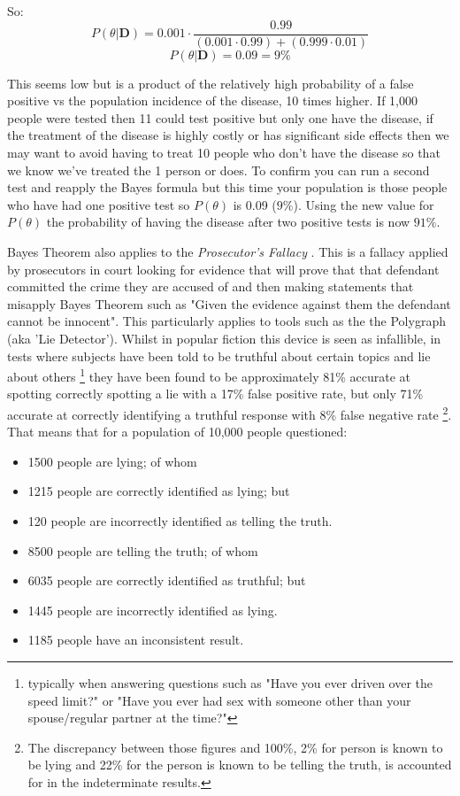 So:
\begin{equation}
    P(\theta | \textbf{D}) = 0.001 \cdot \frac{0.99}{(0.001 \cdot 0.99) + (0.999 \cdot 0.01)}
 \end{equation}
 \begin{equation}
    P(\theta | \textbf{D}) = 0.09 = 9\%
\end{equation}

This seems low but is a product of the relatively high probability of a false positive vs the population incidence of the disease, 10 times higher.  If 1,000 people were tested then 11 could test positive but only one have the disease, if the treatment of the disease is highly costly or has significant side effects then we may want to avoid having to treat 10 people who don't have the disease so that we know we've treated the 1 person or does.  To confirm you can run a second test and reapply the Bayes formula but this time your population is those people who have had one positive test so $P(\theta)$ is 0.09 ($9\%$).  Using the new value for $P(\theta)$ the probability of having the disease after two positive tests is now $91\%$.

Bayes Theorem also applies to the \emph{Prosecutor's Fallacy} .  This is a fallacy applied by prosecutors in court looking for evidence that will prove that that defendant committed the crime they are accused of and then making statements that misapply Bayes Theorem such as "Given the evidence against them the defendant cannot be innocent".  This particularly applies to tools such as the the Polygraph (aka 'Lie Detector').  Whilst in popular fiction this device is seen as infallible, in tests where subjects have been told to be truthful about certain topics and lie about others \footnote{typically when answering questions such as "Have you ever driven over the speed limit?" or "Have you ever had sex with someone other than your spouse/regular partner at the time?"} they have been found to be approximately 81\% accurate at spotting correctly spotting a lie with a 17\% false positive rate, but only 71\% accurate at correctly identifying a truthful response with 8\% false negative rate \footnote{The discrepancy between those figures and 100\%, 2\% for person is known to be lying and 22\% for the person is known to be telling the truth, is accounted for in the indeterminate results.}.  That means that for a population of 10,000 people questioned:
\begin{itemize}
    \item 1500 people are lying; of whom
    \item 1215 people are correctly identified as lying; but
    \item 120 people are incorrectly identified as telling the truth.
    \item 8500 people are telling the truth; of whom
    \item 6035 people are correctly identified as truthful; but
    \item 1445 people are incorrectly identified as lying.
    \item 1185 people have an inconsistent result.
\end{itemize}

